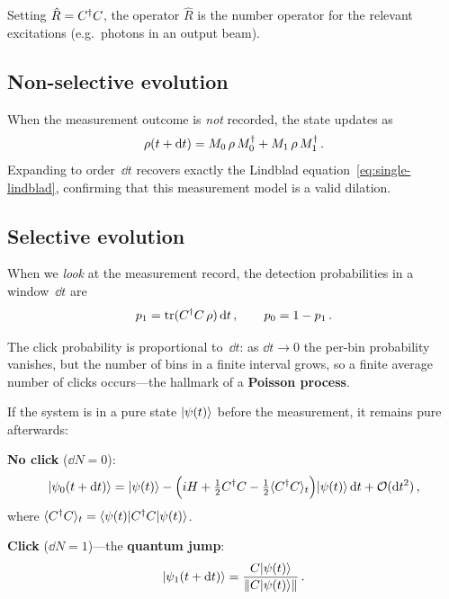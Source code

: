 \begin{remark}
  Setting $\hat{R} = C^\dagger C$, the operator $\hat{R}$ is the number
  operator for the relevant excitations (e.g.\ photons in an output
  beam).
\end{remark}

\subsection{Non-selective evolution}\label{sec:nonselective}

When the measurement outcome is \emph{not} recorded, the state
updates as
\begin{equation}\label{eq:nonselective-update}
  \rho(t + \mathrm{d} t)
  = M_0\,\rho\, M_0^\dagger + M_1\,\rho\, M_1^\dagger\,.
\end{equation}
Expanding to order~$\dd t$ recovers exactly the Lindblad
equation~\eqref{eq:single-lindblad}, confirming that this measurement
model is a valid dilation.

\subsection{Selective evolution}\label{sec:selective}

When we \emph{look} at the measurement record, the detection
probabilities in a window~$\dd t$ are
\begin{equation}\label{eq:click-prob}
  p_1 = \operatorname{tr}(C^\dagger C\,\rho)\,\mathrm{d} t\,,\qquad
  p_0 = 1 - p_1\,.
\end{equation}

\begin{intuition}
  The click probability is proportional to~$\dd t$: as $\dd t \to 0$
  the per-bin probability vanishes, but the number of bins in a finite
  interval grows, so a finite average number of clicks occurs---the
  hallmark of a \textbf{Poisson process}.
\end{intuition}

If the system is in a pure state $\lvert \psi(t) \rangle$ before the
measurement, it remains pure afterwards:

\begin{keyresult}
  \textbf{No click} ($\dd N = 0$):
  \begin{equation}\label{eq:psi-noclick}
    \lvert \psi_0(t+\mathrm{d} t) \rangle
    = \lvert \psi(t) \rangle
      - \Bigl(iH + \tfrac{1}{2}C^\dagger C
        - \tfrac{1}{2}\langle C^\dagger C \rangle_t\Bigr)
        \lvert \psi(t) \rangle\,\mathrm{d} t
      + \mathcal{O}(\mathrm{d} t^2)\,,
  \end{equation}
  where $\langle C^\dagger C \rangle_t = \langle \psi(t) \rvert C^\dagger C\lvert \psi(t) \rangle$.

  \textbf{Click} ($\dd N = 1$)---the \textbf{quantum jump}:
  \begin{equation}\label{eq:psi-click}
    \lvert \psi_1(t+\mathrm{d} t) \rangle
    = \frac{C\lvert \psi(t) \rangle}{\lVert C\lvert \psi(t) \rangle \rVert}\,.
  \end{equation}
\end{keyresult}

